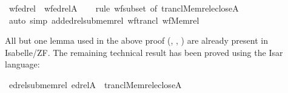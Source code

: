 \begin{isabelle}
\isamarkupfalse%
\ wf{\isacharunderscore}edrel\ {\isacharcolon}\ {\isachardoublequoteopen}wf{\isacharparenleft}edrel{\isacharparenleft}A{\isacharparenright}{\isacharparenright}{\isachardoublequoteclose}\isanewline
\ \ \isamarkupfalse%
\ {\isacharparenleft}rule\ wf{\isacharunderscore}subset\ {\isacharbrackleft}of\ {\isachardoublequoteopen}trancl{\isacharparenleft}Memrel{\isacharparenleft}eclose{\isacharparenleft}A{\isacharparenright}{\isacharparenright}{\isacharparenright}{\isachardoublequoteclose}{\isacharbrackright}{\isacharparenright}\isanewline
\ \ \isamarkupfalse%
\ {\isacharparenleft}auto\ simp\ add{\isacharcolon}edrel{\isacharunderscore}sub{\isacharunderscore}memrel\ wf{\isacharunderscore}trancl\ wf{\isacharunderscore}Memrel{\isacharparenright}\isanewline
\ \ \isamarkupfalse%
%
\end{isabelle}
%
All but one lemma used in the above proof
(,
, 
) are already
present in Isabelle/ZF. The remaining technical result has
been proved using the Isar language:
%
\begin{isabelle}
\isamarkupfalse%
\ edrel{\isacharunderscore}sub{\isacharunderscore}memrel{\isacharcolon}\ {\isachardoublequoteopen}edrel{\isacharparenleft}A{\isacharparenright}\ {\isasymsubseteq}\ trancl{\isacharparenleft}Memrel{\isacharparenleft}eclose{\isacharparenleft}A{\isacharparenright}{\isacharparenright}{\isacharparenright}{\isachardoublequoteclose}
\end{isabelle}

